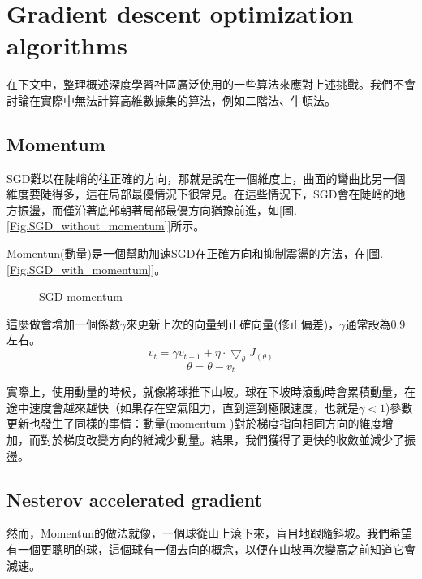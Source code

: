 \documentclass[13pt, a4paper]{report}
\begin{document}
\chapter{Gradient descent optimization algorithms}
在下文中，整理概述深度學習社區廣泛使用的一些算法來應對上述挑戰。我們不會討論在實際中無法計算高維數據集的算法，例如二階法、牛頓法。
\section{Momentum}
SGD難以在陡峭的往正確的方向，那就是說在一個維度上，曲面的彎曲比另一個維度要陡得多，這在局部最優情況下很常見。在這些情況下，SGD會在陡峭的地方振盪，而僅沿著底部朝著局部最優方向猶豫前進，如[圖.\ref{Fig.SGD_without_momentum}]所示。

Momentun(動量)是一個幫助加速SGD在正確方向和抑制震盪的方法，在[圖.\ref{Fig.SGD_with_momentum}]。
\begin{figure}[htbp]
\centering
{}

\centering
\caption{SGD momentum}
\end{figure}

這麼做會增加一個係數$\gamma$來更新上次的向量到正確向量(修正偏差)，$\gamma$通常設為0.9左右。
$$v_t = \gamma v_{t-1}+\eta\cdot\bigtriangledown_{\theta}J_{(\theta)}$$
$$\theta = \theta-v_t$$

實際上，使用動量的時候，就像將球推下山坡。球在下坡時滾動時會累積動量，在途中速度會越來越快（如果存在空氣阻力，直到達到極限速度，也就是$\gamma <1$)參數更新也發生了同樣的事情：動量(momentum )對於梯度指向相同方向的維度增加，而對於梯度改變方向的維減少動量。結果，我們獲得了更快的收斂並減少了振盪。
\section{Nesterov accelerated gradient}
然而，Momentun的做法就像，一個球從山上滾下來，盲目地跟隨斜坡。我們希望有一個更聰明的球，這個球有一個去向的概念，以便在山坡再次變高之前知道它會減速。
\end{document}
